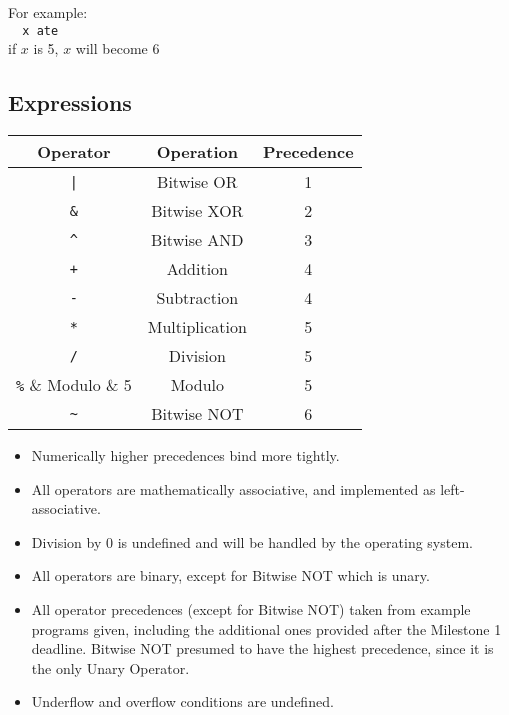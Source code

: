 \documentclass[a4wide, 11pt]{article}
\begin{document}
For example:\\
\verb:  x ate:\\
if $x$ is 5, $x$ will become 6

\subsection{Expressions}
\begin{tabular}{ccc}
Operator & Operation   & Precedence \\
\hline
\hline
\verb:|: & Bitwise OR  & 1 \\
\hline
\verb:&: & Bitwise XOR & 2 \\
\hline
\verb:^: & Bitwise AND & 3 \\
\hline
\verb:+: & Addition    & 4 \\
\verb:-: & Subtraction & 4 \\
\hline
\verb:*: & Multiplication & 5 \\
\verb:/: & Division       & 5 \\
\verb:%: & Modulo         & 5 \\
\hline
\verb:~: & Bitwise NOT    & 6 \\
\end{tabular}

\begin{itemize}
\item Numerically higher precedences bind more tightly.

\item All operators are mathematically associative, and implemented as
left-associative.

\item Division by 0 is undefined and will be handled by the operating system.

\item All operators are binary, except for Bitwise NOT which is unary.

\item All operator precedences (except for Bitwise NOT) taken from example
programs given, including the additional ones provided after the Milestone 1
deadline. Bitwise NOT presumed to have the highest precedence, since it is the
only Unary Operator.

\item Underflow and overflow conditions are undefined.
\end{itemize}
\end{document}
